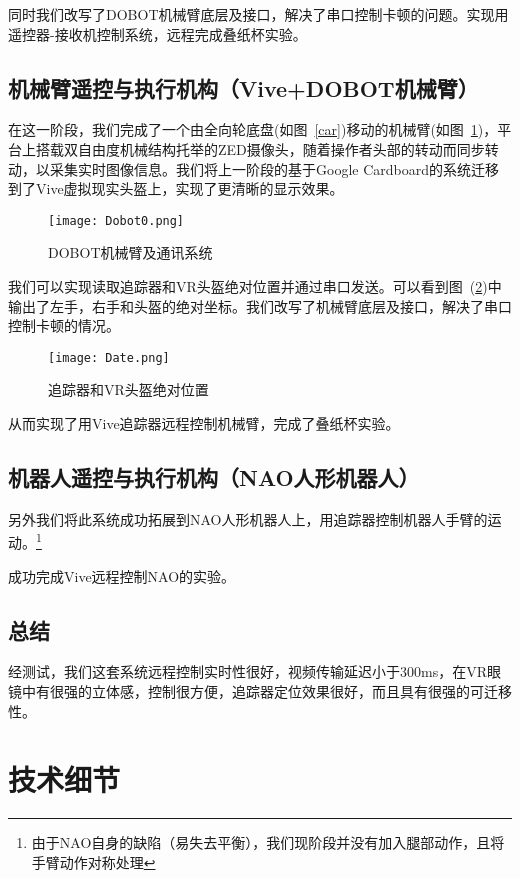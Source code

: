 同时我们改写了DOBOT机械臂底层及接口，解决了串口控制卡顿的问题。实现用遥控器-接收机控制系统，远程完成叠纸杯实验。

\section{机械臂遥控与执行机构（Vive+DOBOT机械臂）}

在这一阶段，我们完成了一个由全向轮底盘(如图~\ref{car})移动的机械臂(如图~\ref{sys})，平台上搭载双自由度机械结构托举的ZED摄像头，随着操作者头部的转动而同步转动，以采集实时图像信息。我们将上一阶段的基于Google Cardboard的系统迁移到了Vive虚拟现实头盔上，实现了更清晰的显示效果。


\begin{figure}[htbp]
\small
\centering
\texttt{[image: Dobot0.png]}
\caption{DOBOT机械臂及通讯系统} 
\label{sys}
\end{figure}


我们可以实现读取追踪器和VR头盔绝对位置并通过串口发送。可以看到图~(\ref{POS})中输出了左手，右手和头盔的绝对坐标。我们改写了机械臂底层及接口，解决了串口控制卡顿的情况。
\begin{figure}[htbp]
\small
\centering
\texttt{[image: Date.png]}
\caption{追踪器和VR头盔绝对位置} 
\label{POS}
\end{figure}

从而实现了用Vive追踪器远程控制机械臂，完成了叠纸杯实验。

\section{机器人遥控与执行机构（NAO人形机器人）}
另外我们将此系统成功拓展到NAO人形机器人上，用追踪器控制机器人手臂的运动。\footnote{由于NAO自身的缺陷（易失去平衡），我们现阶段并没有加入腿部动作，且将手臂动作对称处理}

成功完成Vive远程控制NAO的实验。



\section{总结}

经测试，我们这套系统远程控制实时性很好，视频传输延迟小于300ms，在VR眼镜中有很强的立体感，控制很方便，追踪器定位效果很好，而且具有很强的可迁移性。



\chapter{技术细节}

